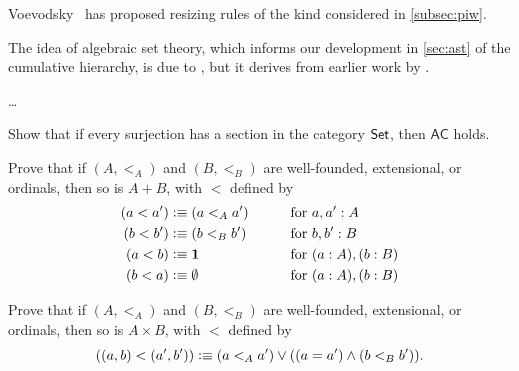 Voevodsky~\cite{Universe-poly} has proposed resizing rules of the kind considered in \autoref{subsec:piw}.

The idea of algebraic set theory, which informs our development in \autoref{sec:ast} of the cumulative hierarchy, is due to \cite{JoyalMoerdijk}, but it derives from earlier work by \cite{AczelCZF}.

\dots

\sectionExercises

\begin{ex}
  Show that if every surjection has a section in the category $\mathsf{Set}$, then $\mathsf{AC}$ holds.
\end{ex}

\begin{ex}
  Prove that if $(A,<_A)$ and $(B,<_B)$ are well-founded, extensional, or ordinals, then so is $A+B$, with $<$ defined by
  \begin{alignat*}{2}
    (a<a') &\vcentcolon\equiv (a<_A a') &\qquad\text{for }& a,a':A\\
    (b<b') &\vcentcolon\equiv (b<_B b') &\qquad\text{for }& b,b':B\\
    (a<b) &\vcentcolon\equiv \mathbf{1} &\qquad\text{for }& (a:A),(b:B)\\
    (b<a) &\vcentcolon\equiv \emptyset &\qquad\text{for } &(a:A),(b:B)
  \end{alignat*}
\end{ex}

\begin{ex}
  Prove that if $(A,<_A)$ and $(B,<_B)$ are well-founded, extensional, or ordinals, then so is $A\times B$, with $<$ defined by
  \[ ((a,b) <(a',b')) \vcentcolon\equiv (a<_A a') \vee ((a=a') \wedge (b<_B b')). \]
\end{ex}

